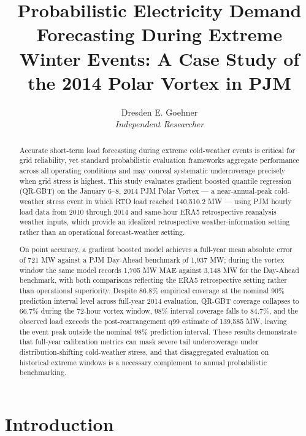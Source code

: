 \documentclass[12pt,a4paper]{article}
\begin{document}
\title{\LARGE\textbf{Probabilistic Electricity Demand Forecasting During Extreme Winter Events: A Case Study of the 2014 Polar Vortex in PJM}}
\author{Dresden E. Goehner\\[4pt]
\textit{Independent Researcher}}
\date{}
\maketitle

\begin{abstract}
Accurate short-term load forecasting during extreme cold-weather events is critical for grid reliability, yet standard probabilistic evaluation frameworks aggregate performance across all operating conditions and may conceal systematic undercoverage precisely when grid stress is highest. This study evaluates gradient boosted quantile regression (QR-GBT) on the January 6–8, 2014 PJM Polar Vortex --- a near-annual-peak cold-weather stress event in which RTO load reached 140,510.2 MW --- using PJM hourly load data from 2010 through 2014 and same-hour ERA5 retrospective reanalysis weather inputs, which provide an idealized retrospective weather-information setting rather than an operational forecast-weather setting.

 On point accuracy, a gradient boosted model achieves a full-year mean absolute error of 721 MW against a PJM Day-Ahead benchmark of 1,937 MW; during the vortex window the same model records 1,705 MW MAE against 3,148 MW for the Day-Ahead benchmark, with both comparisons reflecting the ERA5 retrospective setting rather than operational superiority. Despite 86.8\% empirical coverage at the nominal 90\% prediction interval level across full-year 2014 evaluation, QR-GBT coverage collapses to 66.7\% during the 72-hour vortex window, 98\% interval coverage falls to 84.7\%, and the observed load exceeds the post-rearrangement q99 estimate of 139,585 MW, leaving the event peak outside the nominal 98\% prediction interval. These results demonstrate that full-year calibration metrics can mask severe tail undercoverage under distribution-shifting cold-weather stress, and that disaggregated evaluation on historical extreme windows is a necessary complement to annual probabilistic benchmarking.
\end{abstract}

\newpage\tableofcontents\newpage

\section{Introduction}
\end{document}

